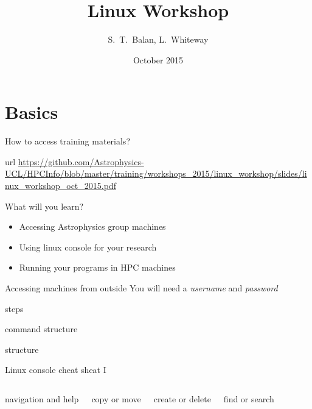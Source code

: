 \documentclass{beamer}
\title[Linux  Workshop] %
{Linux  Workshop}
\author[Balan, Whiteway] %
{S.~T.~Balan, L.~Whiteway}
\institute[UCL]
{
  Department of Physics and Astronomy\\
  University College London
}
\date[Linux  2015]
{October 2015}
\begin{document}
\frame{\titlepage}

\section{Basics}

\begin{frame}{How to access training materials?}
  \begin{block}{url}
    \url{https://github.com/Astrophysics-UCL/HPCInfo/blob/master/training/workshops_2015/linux_workshop/slides/linux_workshop_oct_2015.pdf}
  \end{block}
\end{frame}


\begin{frame}{What will you learn?}
  \begin{itemize}
    \item Accessing Astrophysics group machines
    \item Using linux console for your research
    \item Running your programs in HPC machines
  \end{itemize}
\end{frame}

\begin{frame}[fragile]{Accessing machines from outside}
  \alert{You will need a \emph{username} and \emph{password}}
  \begin{block}{steps}
    
  \end{block}
\end{frame}

\begin{frame}[fragile]{command structure}
  \begin{block}{structure}
    
  \end{block}
  \begin{example}
    
  \end{example}
\end{frame}


\begin{frame}[fragile]{Linux console cheat sheat I}
  \fontsize{7pt}{7}\selectfont
  \begin{columns}
    \begin{block}{navigation and help}
      
    \end{block}
    \begin{block}{copy or move}
      
    \end{block}

    \begin{block}{create or delete}
      
    \end{block}
    \begin{block}{find or search}
      
    \end{block}
  \end{columns}
\end{frame}
\end{document}
